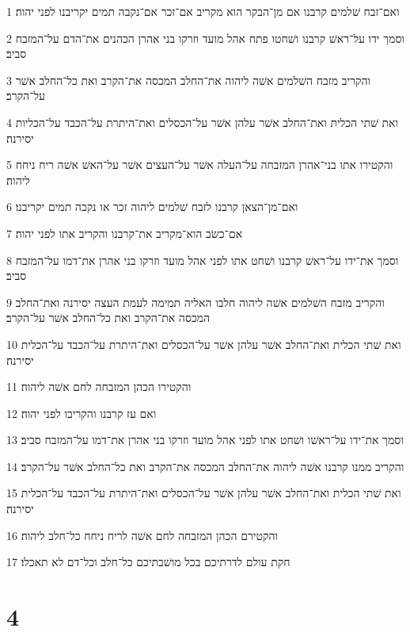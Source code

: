 \par 1 ואם־זבח שׁלמים קרבנו אם מן־הבקר הוא מקריב אם־זכר אם־נקבה תמים יקריבנו לפני יהוה׃
\par 2 וסמך ידו על־ראשׁ קרבנו ושׁחטו פתח אהל מועד וזרקו בני אהרן הכהנים את־הדם על־המזבח סביב׃
\par 3 והקריב מזבח השׁלמים אשׁה ליהוה את־החלב המכסה את־הקרב ואת כל־החלב אשׁר על־הקרב׃
\par 4 ואת שׁתי הכלית ואת־החלב אשׁר עלהן אשׁר על־הכסלים ואת־היתרת על־הכבד על־הכליות יסירנה׃
\par 5 והקטירו אתו בני־אהרן המזבחה על־העלה אשׁר על־העצים אשׁר על־האשׁ אשׁה ריח ניחח ליהוה׃
\par 6 ואם־מן־הצאן קרבנו לזבח שׁלמים ליהוה זכר או נקבה תמים יקריבנו׃
\par 7 אם־כשׂב הוא־מקריב את־קרבנו והקריב אתו לפני יהוה׃
\par 8 וסמך את־ידו על־ראשׁ קרבנו ושׁחט אתו לפני אהל מועד וזרקו בני אהרן את־דמו על־המזבח סביב׃
\par 9 והקריב מזבח השׁלמים אשׁה ליהוה חלבו האליה תמימה לעמת העצה יסירנה ואת־החלב המכסה את־הקרב ואת כל־החלב אשׁר על־הקרב׃
\par 10 ואת שׁתי הכלית ואת־החלב אשׁר עלהן אשׁר על־הכסלים ואת־היתרת על־הכבד על־הכלית יסירנה׃
\par 11 והקטירו הכהן המזבחה לחם אשׁה ליהוה׃
\par 12 ואם עז קרבנו והקריבו לפני יהוה׃
\par 13 וסמך את־ידו על־ראשׁו ושׁחט אתו לפני אהל מועד וזרקו בני אהרן את־דמו על־המזבח סביב׃
\par 14 והקריב ממנו קרבנו אשׁה ליהוה את־החלב המכסה את־הקרב ואת כל־החלב אשׁר על־הקרב׃
\par 15 ואת שׁתי הכלית ואת־החלב אשׁר עלהן אשׁר על־הכסלים ואת־היתרת על־הכבד על־הכלית יסירנה׃
\par 16 והקטירם הכהן המזבחה לחם אשׁה לריח ניחח כל־חלב ליהוה׃
\par 17 חקת עולם לדרתיכם בכל מושׁבתיכם כל־חלב וכל־דם לא תאכלו׃

\chapter{4}

